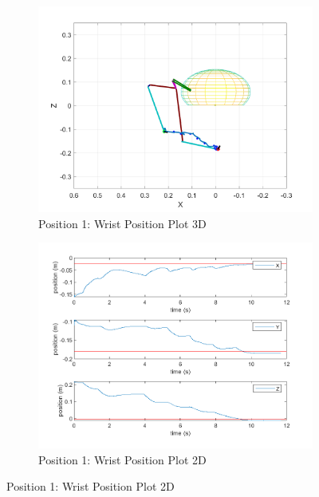 \begin{figure}[ht]
    \centering

    \begin{subfigure}[b]{0.45\textwidth}
        \includegraphics[width=0.8\linewidth]{Pictures/Controller/QSC/2_wp.png}
        \caption{Position 1: Wrist Position Plot 3D}
    \end{subfigure}%
    \hfill
    \begin{subfigure}[b]{0.45\textwidth}
        \includegraphics[width=0.8\linewidth]{Pictures/Controller/QSC/2.png}
        \caption{Position 1: Wrist Position Plot 2D}
    \end{subfigure}

    \vspace{2pt} %


\end{figure}
